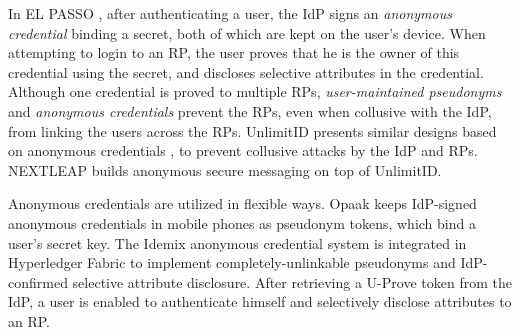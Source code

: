 
In EL PASSO \cite{ELPASSO}, after authenticating a user,
    the IdP signs an \emph{anonymous credential} \cite{anon-credential} binding a secret,
         both of which are kept on the user's device.
When attempting to login to an RP,
    the user proves that he is the owner of this credential using the secret,
        and discloses selective attributes in the credential.
Although one credential is proved to multiple RPs,
        \emph{user-maintained pseudonyms} and \emph{anonymous credentials} prevent the RPs, even when collusive with the IdP, from linking the users across the RPs.
UnlimitID \cite{UnlimitID} presents similar designs based on anonymous credentials \cite{anon-credential},
        to prevent collusive attacks by the IdP and RPs.
NEXTLEAP \cite{nextleap} builds anonymous secure messaging on top of UnlimitID.


Anonymous credentials \cite{anon-credential-2001,anon-credential} are utilized in flexible ways.
Opaak \cite{Opaak} keeps IdP-signed anonymous credentials in mobile phones as pseudonym tokens,
    which bind a user's secret key.
The Idemix anonymous credential system \cite{idemix}
 is integrated in Hyperledger Fabric \cite{hyperledge-idemix} to implement completely-unlinkable pseudonyms
        and IdP-confirmed selective attribute disclosure.
After retrieving a U-Prove token \cite{uprov,uprove-conference} from the IdP,
    a user is enabled to authenticate himself and selectively disclose attributes to an RP.

